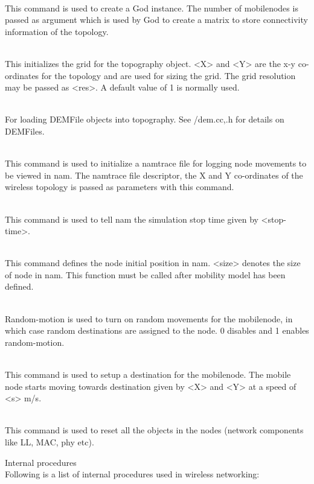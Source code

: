 {\begin{flushleft}
\\
This command is used to create a God instance. The number of mobilenodes
is passed as argument which is used by God to create a matrix to store
connectivity information of the topology.


\\
This initializes the grid for the topography object. <X> and <Y> are the x-y
co-ordinates for the topology and are used for sizing the grid. The grid
resolution may be passed as <res>. A default value of 1 is normally used.


\\
For loading DEMFile objects into topography. See \ns/dem.{cc,.h} for details on
DEMFiles.


\\
This command is used to initialize a namtrace file for logging node movements
to be viewed in nam. The namtrace file descriptor, the X and Y 
co-ordinates of the wireless topology is passed as parameters with this command.


\\
This command is used to tell nam the simulation stop time given by <stop-time>.


\\
This command defines the node initial position in nam. <size> denotes the size
of node in nam. This function must be called after mobility model has been
defined.


\\
Random-motion is used to turn on random movements for the mobilenode, in which
case random destinations are assigned to the node. 0 disables and 1 enables
random-motion.


\\
This command is used to setup a destination for the mobilenode. The mobile
node starts moving towards destination given by <X> and <Y> at a speed of
<s> m/s.


\\
This command is used to reset all the objects in the nodes (network 
components like LL, MAC, phy etc).


Internal procedures\\
Following is a list of internal procedures used in wireless networking:


\end{flushleft}}
